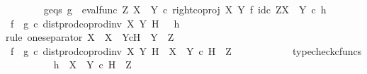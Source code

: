 \begin{isabellebody}
\ \ \ \ \ \ \isamarkupfalse%
\ g{\isacharunderscore}{\kern0pt}eqs{\isacharcolon}{\kern0pt}\ {\isachardoublequoteopen}g\ {\isacharequal}{\kern0pt}\ {\isacharparenleft}{\kern0pt}eval{\isacharunderscore}{\kern0pt}func\ Z\ {\isacharparenleft}{\kern0pt}X\ {\isasymCoprod}\ Y{\isacharparenright}{\kern0pt}\ {\isasymcirc}\isactrlsub c\ right{\isacharunderscore}{\kern0pt}coproj\ X\ Y\ {\isasymtimes}\isactrlsub f\ id\isactrlsub c\ {\isacharparenleft}{\kern0pt}Z\isactrlbsup {\isacharparenleft}{\kern0pt}X\ {\isasymCoprod}\ Y{\isacharparenright}{\kern0pt}\isactrlesup {\isacharparenright}{\kern0pt}{\isacharparenright}{\kern0pt}\isactrlsup {\isasymsharp}\ {\isasymcirc}\isactrlsub c\ h{\isachardoublequoteclose}\isanewline
\ \ \ \ \ \ \isamarkupfalse%
\ {\isachardoublequoteopen}{\isacharparenleft}{\kern0pt}f\isactrlsup {\isasymflat}\ {\isasymamalg}\ g\isactrlsup {\isasymflat}\ {\isasymcirc}\isactrlsub c\ dist{\isacharunderscore}{\kern0pt}prod{\isacharunderscore}{\kern0pt}coprod{\isacharunderscore}{\kern0pt}inv{}\ X\ Y\ H{\isacharparenright}{\kern0pt}\ {\isacharequal}{\kern0pt}\ \ h\isactrlsup {\isasymflat}{\isachardoublequoteclose}\isanewline
\ \ \ \ \ \ \isamarkupfalse%
{\isacharparenleft}{\kern0pt}rule\ one{\isacharunderscore}{\kern0pt}separator{\isacharbrackleft}{\kern0pt}\ X\ {\isacharequal}{\kern0pt}\ {\isachardoublequoteopen}{\isacharparenleft}{\kern0pt}X\ {\isasymCoprod}\ Y{\isacharparenright}{\kern0pt}{\isasymtimes}\isactrlsub cH{\isachardoublequoteclose}{\isacharcomma}{\kern0pt}\ \ Y\ {\isacharequal}{\kern0pt}\ Z{\isacharbrackright}{\kern0pt}{\isacharparenright}{\kern0pt}\isanewline
\ \ \ \ \ \ \ \ \isamarkupfalse%
\ {\isachardoublequoteopen}f\isactrlsup {\isasymflat}\ {\isasymamalg}\ g\isactrlsup {\isasymflat}\ {\isasymcirc}\isactrlsub c\ dist{\isacharunderscore}{\kern0pt}prod{\isacharunderscore}{\kern0pt}coprod{\isacharunderscore}{\kern0pt}inv{}\ X\ Y\ H\ {\isacharcolon}{\kern0pt}\ {\isacharparenleft}{\kern0pt}X\ {\isasymCoprod}\ Y{\isacharparenright}{\kern0pt}\ {\isasymtimes}\isactrlsub c\ H\ {\isasymrightarrow}\ Z{\isachardoublequoteclose}\isanewline
\ \ \ \ \ \ \ \ \ \ \isamarkupfalse%
\ typecheck{\isacharunderscore}{\kern0pt}cfuncs\isanewline
\ \ \ \ \ \ \ \ \isamarkupfalse%
\ {\isachardoublequoteopen}h\isactrlsup {\isasymflat}\ {\isacharcolon}{\kern0pt}\ {\isacharparenleft}{\kern0pt}X\ {\isasymCoprod}\ Y{\isacharparenright}{\kern0pt}\ {\isasymtimes}\isactrlsub c\ H\ {\isasymrightarrow}\ Z{\isachardoublequoteclose}\isanewline

\end{isabellebody}
